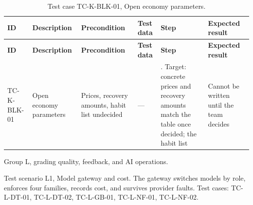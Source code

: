 {\footnotesize{}\renewcommand{\arraystretch}{1.1}
\begin{longtable}{|>{\raggedright\arraybackslash}p{}|>{\raggedright\arraybackslash}p{}|>{\raggedright\arraybackslash}p{}|>{\raggedright\arraybackslash}p{}|>{\raggedright\arraybackslash}p{}|>{\raggedright\arraybackslash}p{}|}
\caption{Test case TC-\allowbreak{}K-\allowbreak{}BLK-\allowbreak{}01, Open economy parameters.} \\
\hline
\textbf{ID} & \textbf{Description} & \textbf{Precondition} & \textbf{Test data} & \textbf{Step} & \textbf{Expected result} \\ \hline
\endfirsthead
\hline
\textbf{ID} & \textbf{Description} & \textbf{Precondition} & \textbf{Test data} & \textbf{Step} & \textbf{Expected result} \\ \hline
\endhead
TC-K-BLK-01 & Open economy parameters & Prices, recovery amounts, habit list undecided & --- & 1. Target: concrete prices and recovery amounts match the table once decided; the habit list & Cannot be written until the team decides \\ \hline
\end{longtable}
}

Group L, grading quality, feedback, and AI operations.

Test scenario L1, Model gateway and cost. The gateway switches models by role, enforces four families, records cost, and survives provider faults. Test cases: TC-L-DT-01, TC-L-DT-02, TC-L-GB-01, TC-L-NF-01, TC-L-NF-02.

